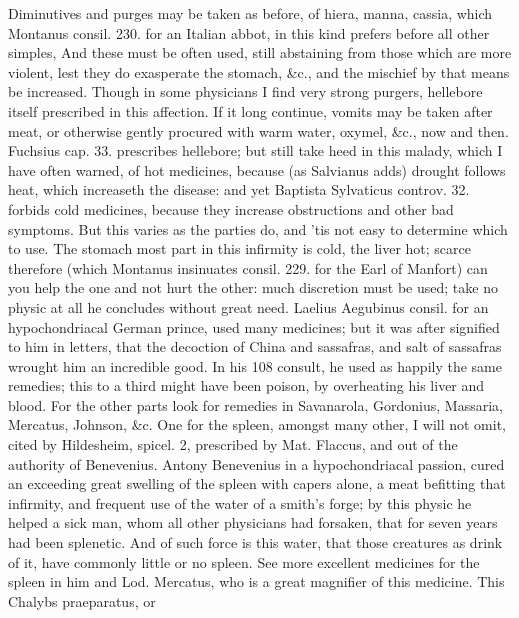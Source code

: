 Diminutives and purges may be taken as before, of hiera, manna,
cassia, which Montanus consil. 230. for an Italian abbot, in this kind
prefers before all other simples, And these must be often used,
still abstaining from those which are more violent, lest they do
exasperate the stomach, \&c., and the mischief by that means be
increased. Though in some physicians I find very strong purgers,
hellebore itself prescribed in this affection. If it long continue,
vomits may be taken after meat, or otherwise gently procured with warm
water, oxymel, \&c., now and then. Fuchsius cap. 33. prescribes
hellebore; but still take heed in this malady, which I have often
warned, of hot medicines, because (as Salvianus adds) drought
follows heat, which increaseth the disease: and yet Baptista Sylvaticus
controv. 32. forbids cold medicines,  because they increase
obstructions and other bad symptoms. But this varies as the parties do,
and 'tis not easy to determine which to use. The stomach most
part in this infirmity is cold, the liver hot; scarce therefore (which
Montanus insinuates consil. 229. for the Earl of Manfort) can you help
the one and not hurt the other: much discretion must be used; take no
physic at all he concludes without great need. Laelius Aegubinus
consil. for an hypochondriacal German prince, used many medicines; but
it was after signified to him in letters, that the decoction of
China and sassafras, and salt of sassafras wrought him an incredible
good. In his 108 consult, he used as happily the same remedies; this to
a third might have been poison, by overheating his liver and blood.
For the other parts look for remedies in Savanarola, Gordonius,
Massaria, Mercatus, Johnson, \&c. One for the spleen, amongst many
other, I will not omit, cited by Hildesheim, spicel. 2, prescribed by
Mat. Flaccus, and out of the authority of Benevenius. Antony Benevenius
in a hypochondriacal passion, cured an exceeding great swelling
of the spleen with capers alone, a meat befitting that infirmity, and
frequent use of the water of a smith's forge; by this physic he helped
a sick man, whom all other physicians had forsaken, that for seven
years had been splenetic. And of such force is this water, that
those creatures as drink of it, have commonly little or no spleen. See
more excellent medicines for the spleen in him and Lod. Mercatus,
who is a great magnifier of this medicine. This Chalybs praeparatus, or
